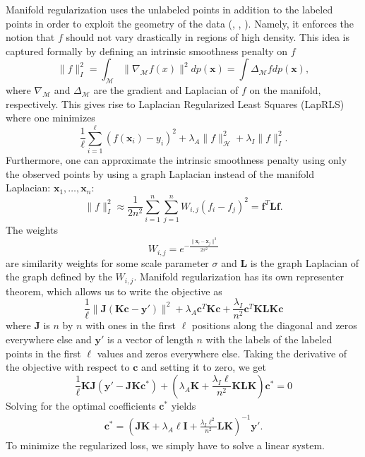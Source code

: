 \documentclass[anon,11pt]{9520} %
\newcommand{\mb}{\mathbf}
\begin{document}
Manifold regularization uses the unlabeled points in addition to the labeled points in
order to exploit the geometry of the data (\cite{Belkin1}, \cite{Belkin2}, \cite{Belkin3}). Namely, it enforces the notion
that $f$ should not vary drastically in regions of high density. This idea
is captured formally by defining an intrinsic smoothness penalty on
$f$ \[\|f\|^2_{I} = \int_{\mathcal{M}} \|\nabla_{\mathcal{M}} f(x)\|^2 dp(\mb x)
= \int\Delta_{\mathcal{M}}f dp(\mb x), \] 
where $\nabla_{\mathcal{M}}$ and $\Delta_{\mathcal{M}}$ are the gradient and Laplacian of $f$ on the manifold,
respectively. This gives rise to Laplacian Regularized Least Squares (LapRLS)
where one minimizes 
\[ \frac{1}{\ell} \sum_{i=1}^{\ell} (f(\mb{x}_i)-y_i)^2 + \lambda_A \|f\|_{\mathcal{H}}^2 + \lambda_I\|f\|_I^2.\]
Furthermore, one can approximate the intrinsic smoothness penalty using only the
observed points by using a graph Laplacian instead of the manifold Laplacian:
$\mb x_1, \dots, \mb x_n$:
\[\|f\|^2_I \approx \frac{1}{2n^2} \sum_{i=1}^{n} \sum_{j=1}^{n} W_{i,j}(f_i-f_j)^2 = \mb f^T \mb L \mb f.\]
The weights
\[W_{i,j} = e^{-\frac{\|\mb{x}_i-\mb{x}_j\|^2}{2\sigma^2}}\]
are similarity weights for some scale parameter $\sigma$ and $\mb L$ is the
graph Laplacian of the graph defined by the $W_{i,j}$. Manifold regularization
has its own representer theorem, which allows us to write the objective as
\[ \frac{1}{\ell} \|\mb J(\mb K \mb c-\mb y')\|^2 + \lambda_A \mb c^T \mb K \mb c + \frac{\lambda_I}{n^2} \mb c^T \mb K \mb L \mb K \mb c \]
where $\mb{J}$ is $n$ by $n$ with ones in the first $\ell$ positions along the
diagonal and zeros everywhere else and $\mb y'$ is a vector of length $n$ with
the labels of the labeled points in the first $\ell$ values and zeros everywhere
else. Taking the derivative of the objective with respect to $\mb c$ and setting it
to zero, we get
\[ \frac{1}{\ell} \mb K \mb J \left(\mb y' - \mb J \mb K \mb c^* \right) + \left( \lambda_A \mb K  + \frac{\lambda_I \ell}{n^2} \mb K \mb L \mb K \right) \mb c^* = 0 \]
Solving for the optimal coefficients $\mb c^*$ yields
\begin{gather}
\mb c^* = \left( \mb J \mb K + \lambda_A \ell \mb I + \frac{\lambda_I\ell^2}{n^2} \mb L \mb K \right)^{-1} \mb y'. \label{eqn:claprls}
\end{gather}
To minimize the regularized loss, we simply have to solve a linear system.
\end{document}
